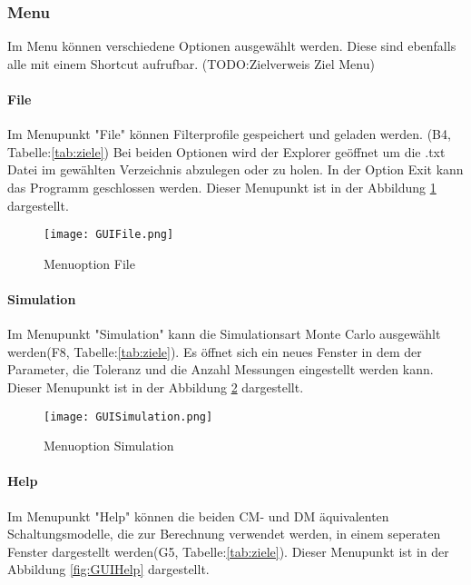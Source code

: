 \subsubsection{Menu} \label{subsubsec:menu}

Im Menu können verschiedene Optionen ausgewählt werden. Diese sind ebenfalls alle mit einem Shortcut aufrufbar. (TODO:Zielverweis Ziel Menu)

\bigskip
{}
\paragraph{File} \label{para:file}
Im Menupunkt "File" können Filterprofile gespeichert und geladen werden. (B4, Tabelle:\ref{tab:ziele}) Bei beiden Optionen wird der Explorer geöffnet um die .txt Datei im gewählten Verzeichnis abzulegen oder zu holen. In der Option Exit kann das Programm geschlossen werden. Dieser Menupunkt ist in der Abbildung \ref{fig:GUIFile}  dargestellt.

\begin{figure}[H]
	\centering
	\texttt{[image: GUIFile.png]}
	\caption{Menuoption File}
	\label{fig:GUIFile}
\end{figure}

\bigskip

\paragraph{Simulation} \label{para:simulation}
Im Menupunkt "Simulation" kann die Simulationsart Monte Carlo ausgewählt werden(F8, Tabelle:\ref{tab:ziele}). Es öffnet sich ein neues Fenster in dem der Parameter, die Toleranz und die Anzahl Messungen eingestellt werden kann. Dieser Menupunkt ist in der Abbildung \ref{fig:GUISimulation} dargestellt.

\begin{figure}[H]
	\centering
	\texttt{[image: GUISimulation.png]}
	\caption{Menuoption Simulation}
	\label{fig:GUISimulation}
\end{figure}


\paragraph{Help} \label{para:Help}
Im Menupunkt "Help" können die beiden CM- und DM äquivalenten Schaltungsmodelle, die zur Berechnung verwendet werden, in einem seperaten Fenster dargestellt werden(G5, Tabelle:\ref{tab:ziele}). Dieser Menupunkt ist in der Abbildung \ref{fig:GUIHelp}  dargestellt.

